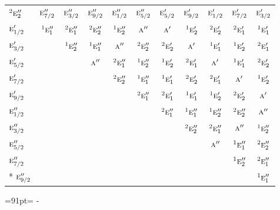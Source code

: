 \documentclass[10pt,a4paper]{article}
\newcommand{\needspace}[1]{\par\penalty-100\begingroup\dimen0=#1\relax\dimen2=\pagegoal
  \advance\dimen2-\pagetotal\ifdim\dimen0>\dimen2\relax\ifdim\dimen2>0pt\vfil\break\fi\fi
  \endgroup}
\numberwithin{equation}{section}
\newcommand{\irr}[1]{\text{\normalfont\scshape #1}}
\newcommand{\conjpair}[1]{{}^{#1}}
\begin{document}
{\begin{longtable}{@{}lcccccccccc@{}}
$\conjpair{2}\irr{e}_{2}''$ & $\irr{e}_{7/2}''$ & $\irr{e}_{3/2}''$ & $\irr{e}_{9/2}''$ & $\irr{e}_{1/2}''$ & $\irr{e}_{5/2}''$ & $\irr{e}_{5/2}'$ & $\irr{e}_{9/2}'$ & $\irr{e}_{1/2}'$ & $\irr{e}_{7/2}'$ & $\irr{e}_{3/2}'$\\
$\irr{e}_{1/2}'$ & $\conjpair{1}\irr{e}_{1}''$ & $\conjpair{2}\irr{e}_{1}''$ & $\conjpair{2}\irr{e}_{2}''$ & $\conjpair{1}\irr{e}_{2}''$ & $\irr{a}''$ & $\irr{a}'$ & $\conjpair{1}\irr{e}_{2}'$ & $\conjpair{2}\irr{e}_{2}'$ & $\conjpair{2}\irr{e}_{1}'$ & $\conjpair{1}\irr{e}_{1}'$\\
$\irr{e}_{3/2}'$ &  & $\conjpair{1}\irr{e}_{2}''$ & $\conjpair{1}\irr{e}_{1}''$ & $\irr{a}''$ & $\conjpair{2}\irr{e}_{2}''$ & $\conjpair{2}\irr{e}_{2}'$ & $\irr{a}'$ & $\conjpair{1}\irr{e}_{1}'$ & $\conjpair{1}\irr{e}_{2}'$ & $\conjpair{2}\irr{e}_{1}'$\\
$\irr{e}_{5/2}'$ &  &  & $\irr{a}''$ & $\conjpair{2}\irr{e}_{1}''$ & $\conjpair{1}\irr{e}_{2}''$ & $\conjpair{1}\irr{e}_{2}'$ & $\conjpair{2}\irr{e}_{1}'$ & $\irr{a}'$ & $\conjpair{1}\irr{e}_{1}'$ & $\conjpair{2}\irr{e}_{2}'$\\
$\irr{e}_{7/2}'$ &  &  &  & $\conjpair{2}\irr{e}_{2}''$ & $\conjpair{1}\irr{e}_{1}''$ & $\conjpair{1}\irr{e}_{1}'$ & $\conjpair{2}\irr{e}_{2}'$ & $\conjpair{2}\irr{e}_{1}'$ & $\irr{a}'$ & $\conjpair{1}\irr{e}_{2}'$\\
$\irr{e}_{9/2}'$ &  &  &  &  & $\conjpair{2}\irr{e}_{1}''$ & $\conjpair{2}\irr{e}_{1}'$ & $\conjpair{1}\irr{e}_{1}'$ & $\conjpair{1}\irr{e}_{2}'$ & $\conjpair{2}\irr{e}_{2}'$ & $\irr{a}'$\\
$\irr{e}_{1/2}''$ &  &  &  &  &  & $\conjpair{2}\irr{e}_{1}''$ & $\conjpair{1}\irr{e}_{1}''$ & $\conjpair{1}\irr{e}_{2}''$ & $\conjpair{2}\irr{e}_{2}''$ & $\irr{a}''$\\
$\irr{e}_{3/2}''$ &  &  &  &  &  &  & $\conjpair{2}\irr{e}_{2}''$ & $\conjpair{2}\irr{e}_{1}''$ & $\irr{a}''$ & $\conjpair{1}\irr{e}_{2}''$\\
$\irr{e}_{5/2}''$ &  &  &  &  &  &  &  & $\irr{a}''$ & $\conjpair{1}\irr{e}_{1}''$ & $\conjpair{2}\irr{e}_{2}''$\\
$\irr{e}_{7/2}''$ &  &  &  &  &  &  &  &  & $\conjpair{1}\irr{e}_{2}''$ & $\conjpair{2}\irr{e}_{1}''$\\*
$\irr{e}_{9/2}''$ &  &  &  &  &  &  &  &  &  & $\conjpair{1}\irr{e}_{1}''$\\
\bottomrule\end{longtable}}
\needspace{91pt}
\end{document}
